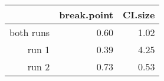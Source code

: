 \documentclass{article}
\begin{document}
\begin{table}[ht]
\centering
\begin{tabular}{rrr}
  \hline
 & break.point & CI.size \\ 
  \hline
both runs & 0.60 & 1.02 \\ 
  run 1 & 0.39 & 4.25 \\ 
  run 2 & 0.73 & 0.53 \\ 
   \hline
\end{tabular}
\end{table}
\end{document}
